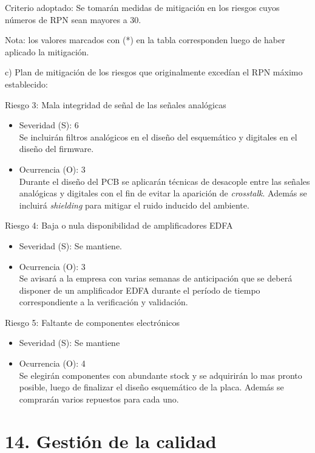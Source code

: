\documentclass[
11pt, %
codirector, %
]{charter}
\begin{document}
Criterio adoptado: 
Se tomarán medidas de mitigación en los riesgos cuyos números de RPN sean mayores a 30.

Nota: los valores marcados con (*) en la tabla corresponden luego de haber aplicado la mitigación.

c) Plan de mitigación de los riesgos que originalmente excedían el RPN máximo establecido:

Riesgo 3: Mala integridad de señal de las señales analógicas
\begin{itemize}
	\item Severidad (S): 6 \\
	Se incluirán filtros analógicos en el diseño del esquemático y digitales en el diseño del firmware.
	\item Ocurrencia (O): 3 \\
	Durante el diseño del PCB se aplicarán técnicas de desacople entre las señales analógicas y digitales con el fin de evitar la aparición de \textit{crosstalk}. Además se incluirá \textit{shielding} para mitigar el ruido inducido del ambiente.
\end{itemize}

Riesgo 4: Baja o nula disponibilidad de amplificadores EDFA
\begin{itemize}
	\item Severidad (S): Se mantiene.
	\item Ocurrencia (O): 3 \\
	Se avisará a la empresa con varias semanas de anticipación que se deberá disponer de un amplificador EDFA durante el período de tiempo correspondiente a la verificación y validación.
\end{itemize}

Riesgo 5: Faltante de componentes electrónicos
\begin{itemize}
	\item Severidad (S): Se mantiene
	\item Ocurrencia (O): 4 \\
	Se elegirán componentes con abundante stock y se adquirirán lo mas pronto posible, luego de finalizar el diseño esquemático de la placa. Además se comprarán varios repuestos para cada uno.
\end{itemize}

\section{14. Gestión de la calidad}
\label{sec:calidad}
\end{document}
